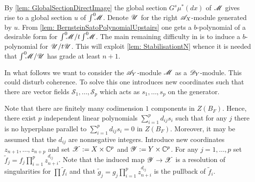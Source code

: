 By \cref{lem: GlobalSectionDirectImage} the global section $G^s \mu^*(dx)$ of $\mathscr{M}$ gives rise to a global section $u$ of $\int^0 \mkern -8mu\mathscr{M}$.
Denote $\mathscr{U}$ for the right $\mathscr{A}_X$-module generated by $u$.
From \cref{lem: BernsteinSatoPolynomialUpstairs} one gets a $b$-polynomial of a desirable form for $\int^0 \mkern -8mu \mathscr{M}/t\int^0 \mkern -8mu\mathscr{M}$.
The main remaining difficulty in is to induce a $b$-polynomial for $\mathscr{U}/t\mathscr{U}$.
This will exploit \cref{lem: StabilisationtN} whence it is needed that $\int^0 \mkern -8mu\mathscr{M} /\mathscr{U}$ has grade at least $n+1$.

In what follows we want to consider the $\mathscr{A}_Y$-module $\mathscr{M}$ as a $\mathscr{D}_Y$-module.
This could disturb coherence.
To solve this one introduces new coordinates such that there are vector fields $\mathcal{S}_1,\ldots, \mathcal{S}_p$ which acts as $s_1,\ldots,s_p$ on the generator.

Note that there are finitely many codimension $1$ components in $Z(B_F)$.
Hence, there exist $p$ independent linear polynomials $\sum_{i=1}^p d_{ij}s_i$ such that for any $j$ there is no hyperplane parallel to $\sum_{i=1}^p d_{ij}s_i = 0$ in $Z(B_F)$.
Moreover, it may be assumed that the $d_{ij}$ are nonnegative integers.
Introduce new coordinates $z_{n+1}, \ldots,z_{n+p}$ and set $\mathscr{X}:= X\times \mathbb{C}^p$ and $\mathscr{Y} := Y\times \mathbb{C}^p$.
For any $j=1,\ldots, p$ set $\widetilde{f}_j = f_j\prod_{i=1}^p z_{n+i}^{d_{ij}}$.
Note that the induced map $\mathscr{Y} \to \mathscr{X}$ is a resolution of singularities for $\prod \widetilde{f}_i$ and that $\widetilde{g}_j = g_j\prod_{i=1}^p z_{n+i}^{d_{ij}}$ is the pullback of $\widetilde{f}_i$.

